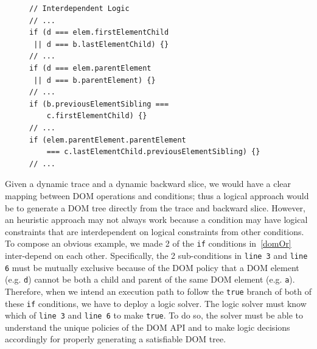 \begin{figure}
\begin{lstlisting}[caption=Example code showing how DOM operations can have logical constraints that are interdependent with each other: {\tt line 3} and {\tt line 6}.  To make all these {\tt if} statements {\tt true} the sub conditions in {\tt line 3} and {\tt line 6} become mutually exclusive: they cannot be {\tt true} at the same time because {\tt d} cannot be both a parent and a child of the same DOM element {\tt elem}.  A logic solver is required to generate a satisfiable DOM tree.  Note that the final 2 conditions ({\tt line 9} and {\tt line 12}) would collectively influence the DOM solver to decide which sub condition ({\tt line 3} vs. {\tt line 6}) to become {\tt true}.,label=domOr]  
// Interdependent Logic
// ...
if (d === elem.firstElementChild
 || d === b.lastElementChild) {}
// ... 
if (d === elem.parentElement
 || d === b.parentElement) {}
// ...
if (b.previousElementSibling === 
    c.firstElementChild) {}
// ... 
if (elem.parentElement.parentElement 
    === c.lastElementChild.previousElementSibling) {}  
// ... 
\end{lstlisting}
\end{figure}


Given a dynamic trace and a dynamic backward slice, we would have a clear mapping between DOM operations and conditions; 
thus a logical approach would be to generate a DOM tree directly from the trace and backward slice.  
However, an heuristic approach may not always work because a condition may have logical constraints that are interdependent on logical constraints from other conditions.  
To compose an obvious example, we made 2 of the {\tt if} conditions in~\autoref{domOr} inter-depend on each other.
Specifically, the 2 sub-conditions in {\tt line 3} and {\tt line 6} must be mutually exclusive because of the DOM policy that a DOM element (e.g. {\tt d}) cannot be both a child and parent of the same DOM element (e.g. {\tt a}).  
Therefore, when we intend an execution path to follow the {\tt true} branch of both of these {\tt if} conditions, we have to deploy a logic solver.  
The logic solver must know which of {\tt line 3} and {\tt line 6} to make {\tt true}.  
To do so, the solver must be able to understand the unique policies of the DOM API and to make logic decisions accordingly for properly generating a satisfiable DOM tree.  


